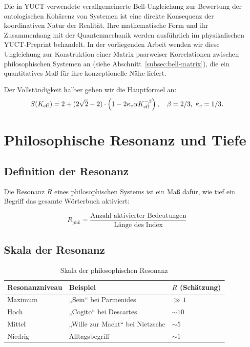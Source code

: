\documentclass[12pt,a4paper]{article}
\newcommand{\kappac}{\kappa_c}
\newcommand{\betaf}{\beta}
\begin{document}
	Die in YUCT verwendete verallgemeinerte Bell-Ungleichung zur Bewertung der ontologischen Kohärenz von Systemen ist eine direkte Konsequenz der koordinativen Natur der Realität. Ihre mathematische Form und ihr Zusammenhang mit der Quantenmechanik werden ausführlich im physikalischen YUCT-Preprint \cite{Yakushev2026b} behandelt. In der vorliegenden Arbeit wenden wir diese Ungleichung zur Konstruktion einer Matrix paarweiser Korrelationen zwischen philosophischen Systemen an (siehe Abschnitt~\ref{subsec:bell-matrix}), die ein quantitatives Maß für ihre konzeptionelle Nähe liefert.
	
	Der Vollständigkeit halber geben wir die Hauptformel an:
	\[
	S(\Keff) = 2 + (2\sqrt{2} - 2) \cdot \left(1 - 2\kappac \alpha \Keff^{-\betaf}\right), \quad \betaf=2/3,\; \kappac=1/3.
	\]
	
	\section{Philosophische Resonanz und Tiefe}
	
	\subsection{Definition der Resonanz}
	
	Die Resonanz \(R\) eines philosophischen Systems ist ein Maß dafür, wie tief ein Begriff das gesamte Wörterbuch aktiviert:
	
	\begin{equation}
		R_{\text{phil}} = \frac{\text{Anzahl aktivierter Bedeutungen}}{\text{Länge des Index}}
	\end{equation}
	
	\subsection{Skala der Resonanz}
	
	\begin{table}[H]
		\centering
		\caption{Skala der philosophischen Resonanz}
		\begin{tabular}{p{4cm}p{5cm}p{5cm}}
			\toprule
			\textbf{Resonanzniveau} & \textbf{Beispiel} & \textbf{\(R\) (Schätzung)} \\
			\midrule
			Maximum & „Sein“ bei Parmenides & \(\gg 1\) \\
			Hoch & „Cogito“ bei Descartes & \(\sim 10\) \\
			Mittel & „Wille zur Macht“ bei Nietzsche & \(\sim 5\) \\
			Niedrig & Alltagsbegriff & \(\sim 1\) \\
			\bottomrule
		\end{tabular}
	\end{table}
	
\end{document}
